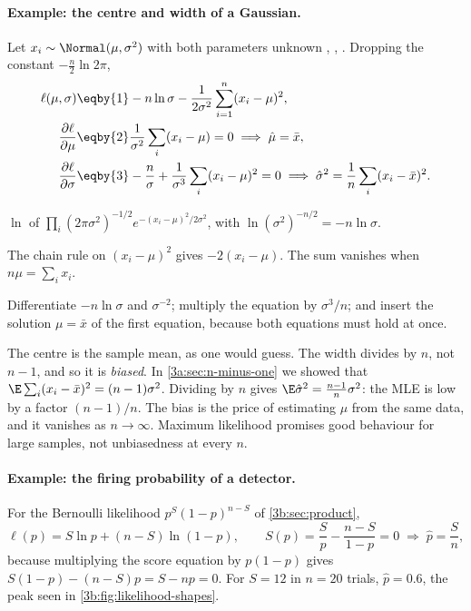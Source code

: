 \paragraph{Example: the centre and width of a Gaussian.}
Let $x_i\sim\Normal(\mu,\sigma^2)$ with both parameters unknown
, ,
. Dropping the constant $-\tfrac n2\ln2\pi$,
\begin{align*}
  \ell(\mu,\sigma)&\eqby{1}-n\ln\sigma-\frac{1}{2\sigma^2}\sum_{i=1}^n(x_i-\mu)^2,\\
  \frac{\partial\ell}{\partial\mu}&\eqby{2}\frac1{\sigma^2}\sum_i(x_i-\mu)=0
  \;\Longrightarrow\;\hat\mu=\bar x,\\
  \frac{\partial\ell}{\partial\sigma}&\eqby{3}-\frac n\sigma+\frac1{\sigma^3}\sum_i(x_i-\mu)^2=0
  \;\Longrightarrow\;\hat\sigma^2=\frac1n\sum_i(x_i-\bar x)^2 .
\end{align*}
\begin{explain}
  \item $\ln$ of $\prod_i(2\pi\sigma^2)^{-1/2}e^{-(x_i-\mu)^2/2\sigma^2}$,
        with $\ln(\sigma^2)^{-n/2}=-n\ln\sigma$.
  \item The chain rule on $(x_i-\mu)^2$ gives $-2(x_i-\mu)$. The sum
        vanishes when $n\mu=\sum_ix_i$.
  \item Differentiate $-n\ln\sigma$ and $\sigma^{-2}$; multiply the equation
        by $\sigma^3/n$; and insert the solution $\mu=\bar x$ of the first
        equation, because both equations must hold at once.
\end{explain}
The centre is the sample mean, as one would guess. The width divides by
$n$, not $n-1$, and so it is \emph{biased}. In \cref{3a:sec:n-minus-one} we
showed that $\E\sum_i(x_i-\bar x)^2=(n-1)\sigma^2$. Dividing by $n$ gives
$\E\hat\sigma^2=\tfrac{n-1}{n}\sigma^2$: the MLE is low by a factor
$(n-1)/n$. The bias is the price of estimating $\mu$ from the same data, and
it vanishes as $n\to\infty$. Maximum likelihood promises good behaviour for
large samples, not unbiasedness at every $n$.

\paragraph{Example: the firing probability of a detector.}
For the Bernoulli likelihood $p^S(1-p)^{n-S}$ of \cref{3b:sec:product},
\[
  \ell(p)=S\ln p+(n-S)\ln(1-p),\qquad
  S(p)=\frac Sp-\frac{n-S}{1-p}=0
  \;\Longrightarrow\;\hat p=\frac Sn ,
\]
because multiplying the score equation by $p(1-p)$ gives
$S(1-p)-(n-S)p=S-np=0$. For $S=12$ in $n=20$ trials, $\hat p=0.6$, the peak
seen in \cref{3b:fig:likelihood-shapes}.

